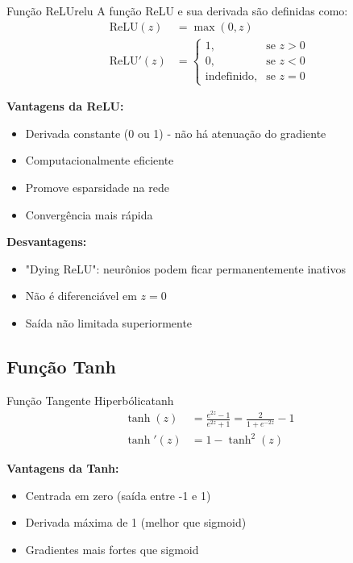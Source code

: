 \documentclass[a4paper,12pt]{article}
\begin{document}
\begin{definicao}{Função ReLU}{relu}
A função ReLU e sua derivada são definidas como:
\begin{align}
    \text{ReLU}(z) &= \max(0, z) \\
    \text{ReLU}'(z) &= \begin{cases}
        1, & \text{se } z > 0 \\
        0, & \text{se } z < 0 \\
        \text{indefinido}, & \text{se } z = 0
    \end{cases}
\end{align}
\end{definicao}

\textbf{Vantagens da ReLU:}
\begin{itemize}
    \item Derivada constante (0 ou 1) - não há atenuação do gradiente
    \item Computacionalmente eficiente
    \item Promove esparsidade na rede
    \item Convergência mais rápida
\end{itemize}

\textbf{Desvantagens:}
\begin{itemize}
    \item "Dying ReLU": neurônios podem ficar permanentemente inativos
    \item Não é diferenciável em $z = 0$
    \item Saída não limitada superiormente
\end{itemize}

\subsection{Função Tanh}

\begin{definicao}{Função Tangente Hiperbólica}{tanh}
\begin{align}
    \tanh(z) &= \frac{e^{2z} - 1}{e^{2z} + 1} = \frac{2}{1 + e^{-2z}} - 1 \\
    \tanh'(z) &= 1 - \tanh^2(z)
\end{align}
\end{definicao}

\textbf{Vantagens da Tanh:}
\begin{itemize}
    \item Centrada em zero (saída entre -1 e 1)
    \item Derivada máxima de 1 (melhor que sigmoid)
    \item Gradientes mais fortes que sigmoid
\end{itemize}
\end{document}
